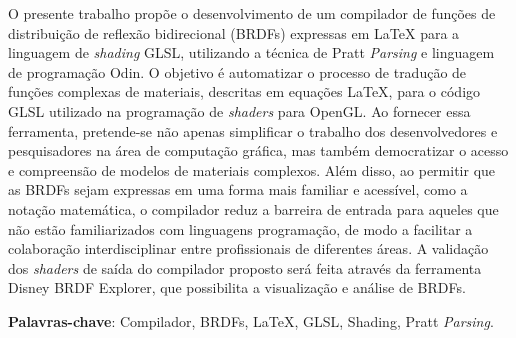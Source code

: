 \setlength{\absparsep}{18pt} %
\begin{resumo}
 


  O presente trabalho propõe o desenvolvimento de um compilador de funções de distribuição de reflexão bidirecional (BRDFs) expressas em \LaTeX{}  para a linguagem de \textit{shading} GLSL, utilizando a técnica de Pratt \textit{Parsing} e linguagem de programação Odin.
  O objetivo é automatizar o processo de tradução de funções complexas de materiais, descritas em equações \LaTeX{}, para o código GLSL utilizado na programação de \textit{shaders} para OpenGL.
  Ao fornecer essa ferramenta, pretende-se não apenas simplificar o trabalho dos desenvolvedores e pesquisadores na área de computação gráfica, mas também democratizar o acesso e compreensão de modelos de materiais complexos. Além disso, ao permitir que as BRDFs sejam expressas em uma forma mais familiar e acessível, como a notação matemática, o compilador reduz a barreira de entrada para aqueles que não estão familiarizados com linguagens programação, de modo a facilitar a colaboração interdisciplinar entre profissionais de diferentes áreas. A validação dos \textit{shaders} de saída do compilador proposto será feita através da ferramenta Disney BRDF Explorer, que possibilita a visualização e análise de BRDFs.

  \textbf{Palavras-chave}: Compilador, BRDFs, LaTeX, GLSL, Shading, Pratt \textit{Parsing}.
\end{resumo}
